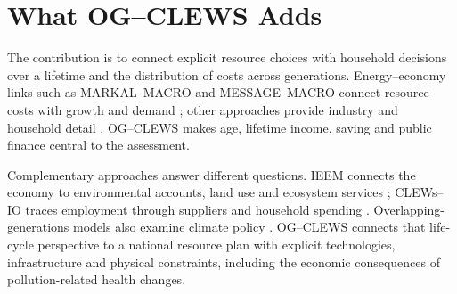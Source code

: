 \section{What OG--CLEWS Adds}
\label{sec:landscape}

The contribution is to connect explicit resource choices with household decisions
over a lifetime and the distribution of costs across generations. Energy--economy
links such as MARKAL--MACRO and MESSAGE--MACRO connect resource costs with growth
and demand \citep{manne_wene_1992,messner_schrattenholzer_2000}; other approaches provide
industry and household detail \citep{bohringer_rutherford_2008,rausch_2011}.
OG--CLEWS makes age, lifetime income, saving and public finance central to the assessment.

Complementary approaches answer different questions. IEEM connects the economy to
environmental accounts, land use and ecosystem services \citep{banerjee_ieem_2020};
CLEWs--IO traces employment through suppliers and household spending
\citep{bararzadeh_clews_io_2026}. Overlapping-generations models also examine climate
policy \citep{kotlikoff_2021}. OG--CLEWS connects that life-cycle perspective to a
national resource plan with explicit technologies, infrastructure and physical
constraints, including the economic consequences of pollution-related health changes.

